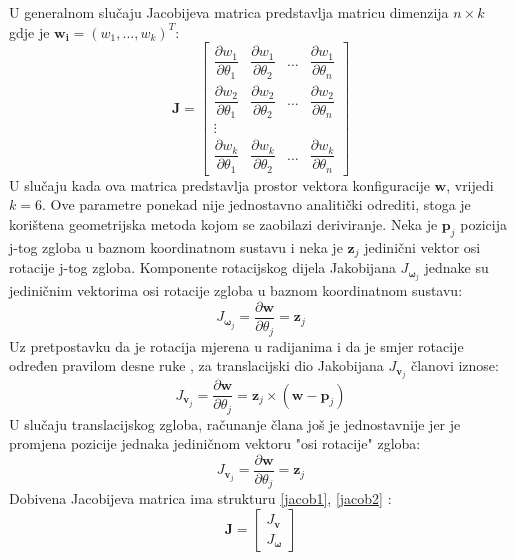 \documentclass[times, utf8, diplomski, numeric]{fer}
\begin{document}
U generalnom slučaju Jacobijeva matrica predstavlja matricu dimenzija $n \times k$ gdje je $\mathbf{w_i} = (w_1, \ldots , w_k)^T$:
\begin{equation}
\mathbf{J} =
\begin{bmatrix}
    \dfrac{\partial {w_1}}{\partial \theta_{1}}      & \dfrac{\partial {w}_{1}}{\partial \theta_{2}}  & \dots & \dfrac{\partial {w}_{1}}{\partial \theta_{n}}  \\
    \dfrac{\partial{w}_{2}}{\partial \theta_{1}}      & \dfrac{\partial {w}_{2}}{\partial \theta_{2}}  & \dots & \dfrac{\partial {w}_{2}}{\partial \theta_{n}} \\
    \vdots \\
    \dfrac{\partial {w}_{k}}{\partial \theta_{1}}      & \dfrac{\partial {w}_{k}}{\partial \theta_{2}}  & \dots & \dfrac{\partial {w}_{k}}{\partial \theta_{n}}
\end{bmatrix}
\end{equation}
U slučaju kada ova matrica predstavlja prostor vektora konfiguracije $\mathbf{w}$, vrijedi $k=6$.
Ove parametre ponekad nije jednostavno analitički odrediti, stoga je korištena geometrijska metoda kojom se zaobilazi deriviranje. 
Neka je $\mathbf{p}_{j}$ pozicija j-tog zgloba u baznom koordinatnom sustavu i neka je $\mathbf{z}_{j}$ jedinični vektor osi rotacije j-tog zgloba. 
Komponente rotacijskog dijela Jakobijana $J_{\bm{\omega}_j}$ jednake su jediničnim vektorima osi rotacije zgloba u baznom koordinatnom sustavu:
\begin{equation}
J_{\bm{\omega}_j} = \dfrac{\partial \textbf{w}}{ \partial \theta_{j}} = \textbf{z}_{j}
\end{equation}
Uz pretpostavku da je rotacija mjerena u radijanima i da je smjer rotacije određen pravilom desne ruke , za translacijski dio Jakobijana $J_{\bm{v}_j}$ članovi iznose:
\begin{equation}
J_{\bm{v}_j} = \dfrac{\partial \mathbf{w}}{ \partial \theta_{j}} = \mathbf{z}_{j} \times (\mathbf{w} - \mathbf{p}_{j})
\end{equation}
U slučaju translacijskog zgloba, računanje člana još je jednostavnije jer je promjena pozicije jednaka jediničnom vektoru "osi rotacije" zgloba:
\begin{equation}
J_{\bm{v}_j} = \dfrac{\partial \mathbf{w}}{ \partial \theta_{j}} = \mathbf{z}_{j}
\end{equation}
Dobivena Jacobijeva matrica ima strukturu \ref{jacob1}, \ref{jacob2} :
\begin{equation}
\mathbf{J} =
\begin{bmatrix}
J_{\bm{v}}\\
J_{\bm{\omega}}
\end{bmatrix}
\label{jacob1}
\end{equation}
\end{document}
